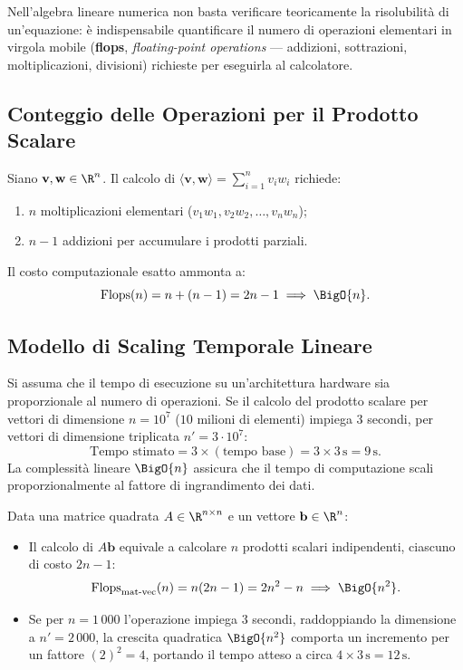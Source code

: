 Nell'algebra lineare numerica non basta verificare teoricamente la risolubilità di un'equazione: è indispensabile quantificare il numero di operazioni elementari in virgola mobile (\textbf{flops}, \textit{floating-point operations} — addizioni, sottrazioni, moltiplicazioni, divisioni) richieste per eseguirla al calcolatore.

\subsection{Conteggio delle Operazioni per il Prodotto Scalare}

Siano $\mathbf{v}, \mathbf{w} \in \R^n$. Il calcolo di $\langle \mathbf{v}, \mathbf{w} \rangle = \sum_{i=1}^n v_i w_i$ richiede:
\begin{enumerate}
    \item $n$ moltiplicazioni elementari ($v_1 w_1, v_2 w_2, \dots, v_n w_n$);
    \item $n - 1$ addizioni per accumulare i prodotti parziali.
\end{enumerate}
Il costo computazionale esatto ammonta a:
\begin{equation}
    \text{Flops}(n) = n + (n - 1) = 2n - 1 \implies \BigO{n}.
\end{equation}

\subsection{Modello di Scaling Temporale Lineare}

Si assuma che il tempo di esecuzione su un'architettura hardware sia proporzionale al numero di operazioni. Se il calcolo del prodotto scalare per vettori di dimensione $n = 10^7$ ($10$ milioni di elementi) impiega $3$ secondi, per vettori di dimensione triplicata $n' = 3 \cdot 10^7$:
\begin{equation}
    \text{Tempo stimato} = 3 \times (\text{tempo base}) = 3 \times 3\,\text{s} = 9\,\text{s}.
\end{equation}
La complessità lineare $\BigO{n}$ assicura che il tempo di computazione scali proporzionalmente al fattore di ingrandimento dei dati.

\begin{remark}
Data una matrice quadrata $A \in \R^{n \times n}$ e un vettore $\mathbf{b} \in \R^n$:
\begin{itemize}
    \item Il calcolo di $A \mathbf{b}$ equivale a calcolare $n$ prodotti scalari indipendenti, ciascuno di costo $2n - 1$:
    \begin{equation}
        \text{Flops}_{\text{mat-vec}}(n) = n (2n - 1) = 2n^2 - n \implies \BigO{n^2}.
    \end{equation}
    \item Se per $n = 1\,000$ l'operazione impiega $3$ secondi, raddoppiando la dimensione a $n' = 2\,000$, la crescita quadratica $\BigO{n^2}$ comporta un incremento per un fattore $(2)^2 = 4$, portando il tempo atteso a circa $4 \times 3\,\text{s} = 12\,\text{s}$.
\end{itemize}
\end{remark}

